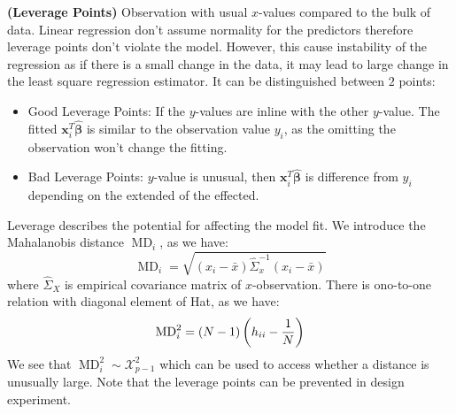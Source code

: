 \begin{definition}{\textbf{(Leverage Points)}}
    Observation with usual $x$-values compared to the bulk of data. Linear regression don't assume normality for the predictors therefore leverage points don't violate the model. However, this cause instability of the regression as if there is a small change in the data, it may lead to large change in the least square regression estimator. It can be distinguished between $2$ points:
    \begin{itemize}
        \item Good Leverage Points: If the $y$-values are inline with the other $y$-value. The fitted $\boldsymbol x^T_i\hat{\boldsymbol \beta}$ is similar to the observation value $y_i$, as the omitting the observation won't change the fitting. 
        \item Bad Leverage Points: $y$-value is unusual, then $\boldsymbol x_i^T\hat{\boldsymbol \beta}$ is difference from $y_i$ depending on the extended of the effected. 
    \end{itemize}
    Leverage describes the potential for affecting the model fit. We introduce the Mahalanobis distance $\operatorname{MD}_i$, as we have:
    \begin{equation*}
        \operatorname{MD}_i = \sqrt{(x_i - \bar{x})\hat{\Sigma}_x^{-1}(x_i - \bar{x})}
    \end{equation*}
    where $\hat{\Sigma}_X$ is empirical covariance matrix of $x$-observation. There is ono-to-one relation with diagonal element of Hat, as we have:
    \begin{equation*}
        \operatorname{MD}_i^2 = (N-1)\left( h_{ii} - \frac{1}{N} \right)
    \end{equation*}
    We see that $\operatorname{MD}_i^2 \sim \mathcal{X}^2_{p-1}$ which can be used to access whether a distance is unusually large. Note that the leverage points can be prevented in design experiment. 
\end{definition}

